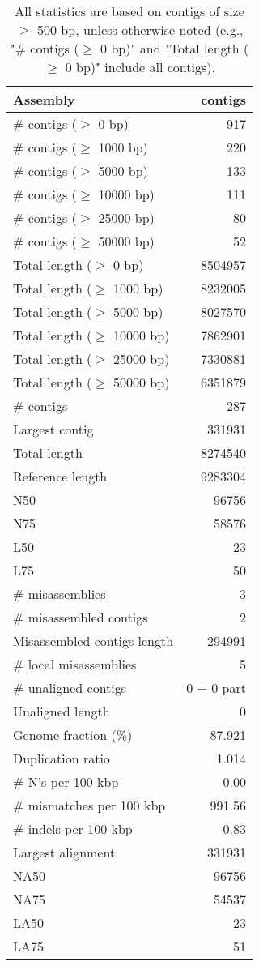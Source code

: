 \documentclass[12pt,a4paper]{article}
\begin{document}
\begin{table}[ht]
\begin{center}
\caption{All statistics are based on contigs of size $\geq$ 500 bp, unless otherwise noted (e.g., "\# contigs ($\geq$ 0 bp)" and "Total length ($\geq$ 0 bp)" include all contigs).}
\begin{tabular}{|l*{1}{|r}|}
\hline
Assembly & contigs \\ \hline
\# contigs ($\geq$ 0 bp) & 917 \\ \hline
\# contigs ($\geq$ 1000 bp) & 220 \\ \hline
\# contigs ($\geq$ 5000 bp) & 133 \\ \hline
\# contigs ($\geq$ 10000 bp) & 111 \\ \hline
\# contigs ($\geq$ 25000 bp) & 80 \\ \hline
\# contigs ($\geq$ 50000 bp) & 52 \\ \hline
Total length ($\geq$ 0 bp) & 8504957 \\ \hline
Total length ($\geq$ 1000 bp) & 8232005 \\ \hline
Total length ($\geq$ 5000 bp) & 8027570 \\ \hline
Total length ($\geq$ 10000 bp) & 7862901 \\ \hline
Total length ($\geq$ 25000 bp) & 7330881 \\ \hline
Total length ($\geq$ 50000 bp) & 6351879 \\ \hline
\# contigs & 287 \\ \hline
Largest contig & 331931 \\ \hline
Total length & 8274540 \\ \hline
Reference length & 9283304 \\ \hline
N50 & 96756 \\ \hline
N75 & 58576 \\ \hline
L50 & 23 \\ \hline
L75 & 50 \\ \hline
\# misassemblies & 3 \\ \hline
\# misassembled contigs & 2 \\ \hline
Misassembled contigs length & 294991 \\ \hline
\# local misassemblies & 5 \\ \hline
\# unaligned contigs & 0 + 0 part \\ \hline
Unaligned length & 0 \\ \hline
Genome fraction (\%) & 87.921 \\ \hline
Duplication ratio & 1.014 \\ \hline
\# N's per 100 kbp & 0.00 \\ \hline
\# mismatches per 100 kbp & 991.56 \\ \hline
\# indels per 100 kbp & 0.83 \\ \hline
Largest alignment & 331931 \\ \hline
NA50 & 96756 \\ \hline
NA75 & 54537 \\ \hline
LA50 & 23 \\ \hline
LA75 & 51 \\ \hline
\end{tabular}
\end{center}
\end{table}
\end{document}
